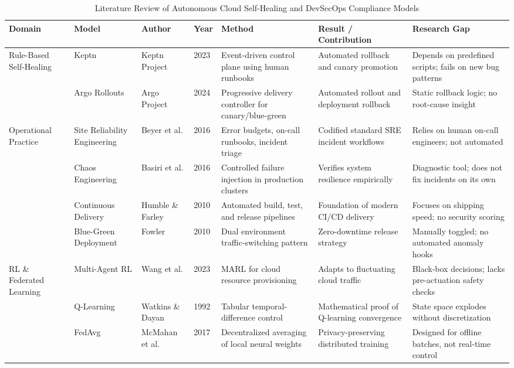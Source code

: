 \documentclass[10pt,conference]{IEEEtran}
\begin{document}
\begin{table}[!t]
\caption{Literature Review of Autonomous Cloud Self-Healing and DevSecOps Compliance Models}
\label{tab:litreview}
\centering
\scriptsize
\setlength{\tabcolsep}{3.5pt}
\renewcommand{\arraystretch}{0.91}
\begin{tabular}{@{}p{1.6cm}p{1.8cm}p{1.8cm}p{0.5cm}p{3.0cm}p{3.2cm}p{3.5cm}@{}}
\toprule
Domain & Model & Author & Year & Method & Result / Contribution & Research Gap \\
\midrule
\multirow{2}{1.6cm}{Rule-Based Self-Healing} & Keptn & Keptn Project \cite{keptn} & 2023 & Event-driven control plane using human runbooks & Automated rollback and canary promotion & Depends on predefined scripts; fails on new bug patterns \\
 & Argo Rollouts & Argo Project \cite{argorollouts} & 2024 & Progressive delivery controller for canary/blue-green & Automated rollout and deployment rollback & Static rollback logic; no root-cause insight \\
\midrule
\multirow{4}{1.6cm}{Operational Practice} & Site Reliability Engineering & Beyer et al. \cite{sre} & 2016 & Error budgets, on-call runbooks, incident triage & Codified standard SRE incident workflows & Relies on human on-call engineers; not automated \\
 & Chaos Engineering & Basiri et al. \cite{chaoseng} & 2016 & Controlled failure injection in production clusters & Verifies system resilience empirically & Diagnostic tool; does not fix incidents on its own \\
 & Continuous Delivery & Humble \& Farley \cite{humblefarley} & 2010 & Automated build, test, and release pipelines & Foundation of modern CI/CD delivery & Focuses on shipping speed; no security scoring \\
 & Blue-Green Deployment & Fowler \cite{fowlerbg} & 2010 & Dual environment traffic-switching pattern & Zero-downtime release strategy & Manually toggled; no automated anomaly hooks \\
\midrule
\multirow{4}{1.6cm}{RL \& Federated Learning} & Multi-Agent RL & Wang et al. \cite{marl} & 2023 & MARL for cloud resource provisioning & Adapts to fluctuating cloud traffic & Black-box decisions; lacks pre-actuation safety checks \\
 & Q-Learning & Watkins \& Dayan \cite{qlearning} & 1992 & Tabular temporal-difference control & Mathematical proof of Q-learning convergence & State space explodes without discretization \\
 & FedAvg & McMahan et al. \cite{fedavg} & 2017 & Decentralized averaging of local neural weights & Privacy-preserving distributed training & Designed for offline batches, not real-time control \\

\end{tabular}
\end{table}
\end{document}
